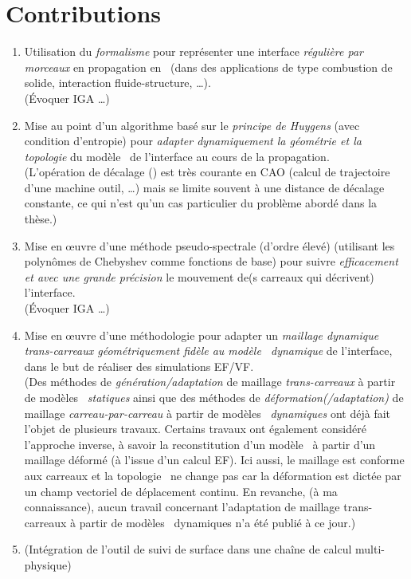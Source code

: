 \section*{Contributions}

\begin{enumerate}
	\item Utilisation du \emph{formalisme \brep} pour représenter une interface \textit{régulière par morceaux} en propagation en \troisD\ (dans des applications de type combustion de solide, interaction fluide-structure, \ldots).\\
	(Évoquer IGA \ldots)
	
	\item Mise au point d’un algorithme basé sur le \emph{principe de Huygens} (avec condition d’entropie) pour \emph{adapter dynamiquement la géométrie et la topologie} du modèle \brep\ de l’interface au cours de la propagation.\\
	(L'opération de décalage () est très courante en CAO (calcul de trajectoire d'une machine outil, \ldots) mais se limite souvent à une distance de décalage constante, ce qui n'est qu'un cas particulier du problème abordé dans la thèse.)
	
	
	\item Mise en \oe uvre d’une méthode pseudo-spectrale (d’ordre élevé) (utilisant les polynômes de Chebyshev comme fonctions de base) pour suivre \emph{efficacement et avec une grande précision} le mouvement de(s carreaux qui décrivent) l’interface.\\
	(Évoquer IGA \ldots)
	
	\item Mise en \oe uvre d’une méthodologie pour adapter un \emph{maillage dynamique trans-carreaux géométriquement fidèle au modèle \brep\ dynamique} de l’interface, dans le but de réaliser des simulations EF/VF.\\
	(Des méthodes de \textit{génération/adaptation} de maillage \textit{trans-carreaux} à partir de modèles \brep\ \textit{statiques} \cite{noel1995, foucault2008} ainsi que %
	des méthodes de \textit{déformation(/adaptation)} de maillage \textit{carreau-par-carreau} à partir de modèles \brep\ \textit{dynamiques} \cite{martin2017} ont déjà fait l'objet de plusieurs travaux. 
	Certains travaux \cite{louhichi2015} ont également considéré l'approche inverse, à savoir la reconstitution d'un modèle \brep\ à partir d'un maillage déformé (à l'issue d'un calcul EF). Ici aussi, le maillage est conforme aux carreaux et la topologie \brep\ ne change pas car la déformation est dictée par un champ vectoriel de déplacement continu. 
	En revanche, (à ma connaissance), aucun travail concernant l'adaptation de maillage trans-carreaux à partir de modèles \brep\ dynamiques n'a été publié à ce jour.)
	
	
	\item (Intégration de l'outil de suivi de surface dans une chaîne de calcul multi-physique)
\end{enumerate}



